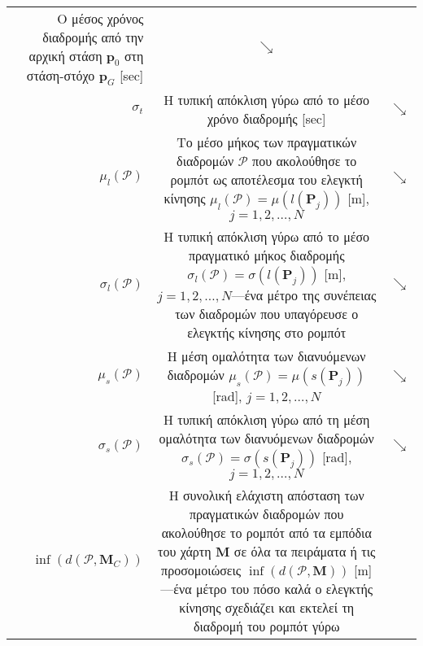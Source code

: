 \begin{table}
\begin{tabular}{rcc}
\begin{minipage}[t]{0.7\columnwidth}
      Ο μέσος χρόνος διαδρομής από την αρχική στάση $\bm{p}_0$ στη στάση-στόχο
      $\bm{p}_G$ [sec]
      \end{minipage} & $\searrow$ \\
    $\sigma_{t}$ &
    \begin{minipage}[t]{0.7\columnwidth}%
      Η τυπική απόκλιση γύρω από το μέσο χρόνο διαδρομής [sec]
      \end{minipage} & $\searrow$ \\
    $\mu_{l}(\bm{\mathcal{P}})$ &
    \begin{minipage}[t]{0.7\columnwidth}%
      Το μέσο μήκος των πραγματικών διαδρομών $\bm{\mathcal{P}}$ που ακολούθησε
      το ρομπότ ως αποτέλεσμα του ελεγκτή κίνησης
      $\mu_l(\bm{\mathcal{P}}) = \mu(l(\bm{P}_j))$ [m], $j = 1,2,\dots,N$
      \end{minipage} & $\searrow$ \\
    $\sigma_{l}(\bm{\mathcal{P}})$ &
    \begin{minipage}[t]{0.7\columnwidth}%
      Η τυπική απόκλιση γύρω από το μέσο πραγματικό μήκος διαδρομής
      $\sigma_l(\bm{\mathcal{P}}) = \sigma(l(\bm{P}_j))$ [m],
      $j = 1,2,\dots,N$---ένα μέτρο της συνέπειας των διαδρομών που υπαγόρευσε
      ο ελεγκτής κίνησης στο ρομπότ
      \end{minipage} & $\searrow$ \\
    $\mu_{s}(\bm{\mathcal{P}})$ &
    \begin{minipage}[t]{0.7\columnwidth}%
      Η μέση ομαλότητα των διανυόμενων διαδρομών
      $\mu_s(\bm{\mathcal{P}}) = \mu(s(\bm{P}_j))$ [rad], $j = 1,2,\dots,N$
      \end{minipage} & $\searrow$ \\
    $\sigma_{s}(\bm{\mathcal{P}})$ &
    \begin{minipage}[t]{0.7\columnwidth}%
      Η τυπική απόκλιση γύρω από τη μέση ομαλότητα των διανυόμενων διαδρομών
      $\sigma_s(\bm{\mathcal{P}}) = \sigma(s(\bm{P}_j))$ [rad], $j = 1,2,\dots,N$
      \end{minipage} & $\searrow$ \\
    $\inf(d(\bm{\mathcal{P}},\bm{M}_C))$ &
    \begin{minipage}[t]{0.7\columnwidth}%
      Η συνολική ελάχιστη απόσταση των πραγματικών διαδρομών που ακολούθησε το
      ρομπότ από τα εμπόδια του χάρτη $\bm{M}$ σε όλα τα πειράματα ή τις
      προσομοιώσεις $\inf(d(\bm{\mathcal{P}}, \bm{M}))$ [m]---ένα μέτρο του πόσο
      καλά ο ελεγκτής κίνησης σχεδιάζει και εκτελεί τη διαδρομή του ρομπότ γύρω

\end{minipage}
\end{tabular}
\end{table}
